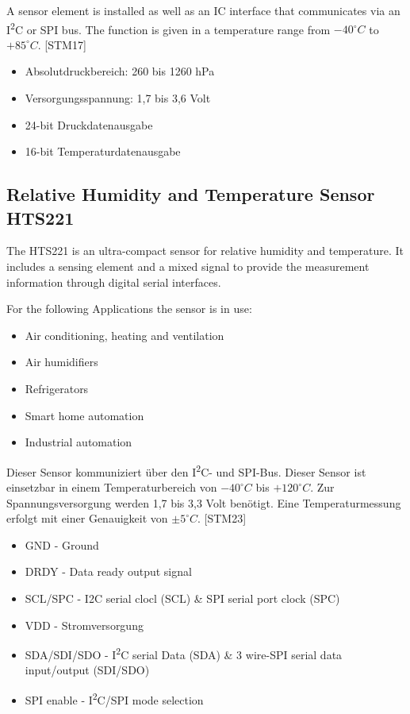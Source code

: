 A sensor element is installed as well as an IC interface that communicates via an I\textsuperscript{2}C or SPI bus. The function is given in a temperature range from $-40^\circ C$ to $+85^\circ C$. [STM17]

\begin{itemize}
  \item Absolutdruckbereich: 260 bis 1260 hPa
  \item Versorgungsspannung: 1,7 bis 3,6 Volt
  \item 24-bit Druckdatenausgabe
  \item 16-bit Temperaturdatenausgabe
\end{itemize}

\subsection{Relative Humidity and Temperature Sensor HTS221}
The HTS221 is an ultra-compact sensor for relative humidity and temperature. It includes a sensing element and a mixed signal to provide the measurement information through digital serial interfaces.

For the following Applications the sensor is in use:


\begin{itemize}
    \item Air conditioning, heating and ventilation 
    \item Air humidifiers
    \item Refrigerators
    \item Smart home automation
    \item Industrial automation
\end{itemize}  

Dieser Sensor kommuniziert über den I\textsuperscript{2}C- und SPI-Bus. Dieser Sensor ist einsetzbar in einem Temperaturbereich
von $-40^\circ C$ bis $+120^\circ C$. Zur Spannungsversorgung werden 1,7 bis 3,3 Volt benötigt. Eine Temperaturmessung erfolgt mit einer Genauigkeit von $\pm 5^\circ C$. [STM23]

\begin{itemize}
    \item GND - Ground
    \item DRDY - Data ready output signal
    \item SCL/SPC - I2C serial clocl (SCL) \& SPI serial port clock (SPC)
    \item VDD - Stromversorgung
    \item SDA/SDI/SDO - I\textsuperscript{2}C serial Data (SDA) \& 3 wire-SPI serial data input/output (SDI/SDO)
    \item SPI enable - I\textsuperscript{2}C/SPI mode selection
\end{itemize}

